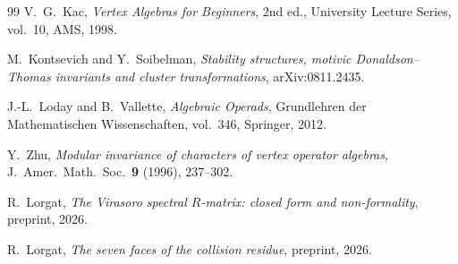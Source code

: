 \documentclass[11pt]{article}
\theoremstyle{plain}
\theoremstyle{definition}
\theoremstyle{remark}
\begin{document}
\begin{thebibliography}{99}
V.~G.~Kac,
\emph{Vertex Algebras for Beginners},
2nd ed., University Lecture Series, vol.~10, AMS, 1998.

M.~Kontsevich and Y.~Soibelman,
\emph{Stability structures, motivic Donaldson--Thomas
invariants and cluster transformations},
arXiv:0811.2435.

J.-L.~Loday and B.~Vallette,
\emph{Algebraic Operads},
Grundlehren der Mathematischen Wissenschaften, vol.~346,
Springer, 2012.

Y.~Zhu,
\emph{Modular invariance of characters of vertex operator
algebras},
J.~Amer.\ Math.\ Soc.\ \textbf{9} (1996), 237--302.

R.~Lorgat,
\emph{The Virasoro spectral $R$-matrix: closed form and non-formality},
preprint, 2026.

R.~Lorgat,
\emph{The seven faces of the collision residue},
preprint, 2026.

\end{thebibliography}
\end{document}
